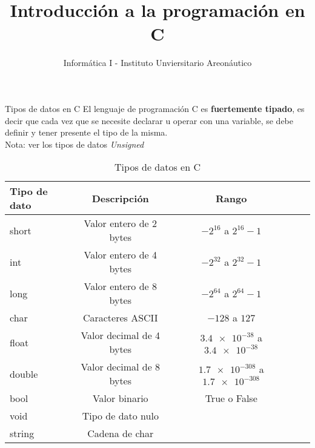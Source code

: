\documentclass[xcolor=pdftex,table,11pt]{beamer}
\author{Informática I - Instituto Unviersitario Areonáutico}
\title{Introducción a la programación en C}
\begin{document}
\begin{frame}
\titlepage
\end{frame}

\begin{frame}
\tableofcontents
\end{frame}

\begin{frame} {Tipos de datos en C}
El lenguaje de programación C es \textbf{fuertemente tipado}, es decir que cada vez que se necesite declarar u operar con una variable, se debe definir y tener presente el tipo de la misma. \\
Nota: ver los tipos de datos \textit{Unsigned}
\begin{table}
\begin{tabular}{l | c | c | c | l }
Tipo de dato & Descripción & Rango  \\
\hline \hline
short & Valor entero de 2 bytes & $-2^{16}$ a $2^{16} -1 $\\ 
int & 	Valor entero de 4 bytes & $-2^{32}$ a $2^{32} -1 $\\ 
long & 	Valor entero de 8 bytes & $-2^{64}$ a $2^{64} -1 $\\ 
char & Caracteres ASCII & $-128 $ a $127$\\ 
float & Valor decimal de 4 bytes & $\num{3.4e-38} $ a $\num{3.4e-38}$\\ 
double & Valor decimal de 8 bytes & $\num{1.7e-308} $ a $\num{1.7e-308}$\\ 
bool & Valor binario &True o False\\ 
void & Tipo de dato nulo &\\ 
 string & Cadena de char  &\\ 
\end{tabular}
\caption{Tipos de datos en C}

\end{table}

\end{frame}
\end{document}
